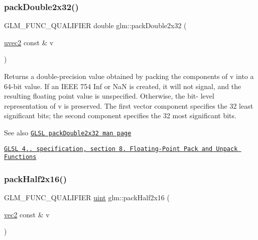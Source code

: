 \subsubsection{\texorpdfstring{pack\+Double2x32()}{packDouble2x32()}}
{\footnotesize\ttfamily G\+L\+M\+\_\+\+F\+U\+N\+C\+\_\+\+Q\+U\+A\+L\+I\+F\+I\+ER double glm\+::pack\+Double2x32 (\begin{DoxyParamCaption}\item[{\hyperlink{group__core__types_gafd2041b45eff671aa8899d2c2835eee9}{uvec2} const \&}]{v }\end{DoxyParamCaption})}

Returns a double-\/precision value obtained by packing the components of v into a 64-\/bit value. If an I\+E\+EE 754 Inf or NaN is created, it will not signal, and the resulting floating point value is unspecified. Otherwise, the bit-\/ level representation of v is preserved. The first vector component specifies the 32 least significant bits; the second component specifies the 32 most significant bits.

\begin{DoxySeeAlso}{See also}
\href{http://www.opengl.org/sdk/docs/manglsl/xhtml/packDouble2x32.xml}{\tt G\+L\+SL pack\+Double2x32 man page} 

\href{http://www.opengl.org/registry/doc/GLSLangSpec.4.20.8.pdf}{\tt G\+L\+SL 4.. specification, section 8. Floating-\/\+Point Pack and Unpack Functions} 
\end{DoxySeeAlso}
\mbox{\label{group__core__func__packing_ga082f6dd65f73a547ed3067ef00be036f}} 
\subsubsection{\texorpdfstring{pack\+Half2x16()}{packHalf2x16()}}
{\footnotesize\ttfamily G\+L\+M\+\_\+\+F\+U\+N\+C\+\_\+\+Q\+U\+A\+L\+I\+F\+I\+ER \hyperlink{group__core__precision_ga4fd29415871152bfb5abd588334147c8}{uint} glm\+::pack\+Half2x16 (\begin{DoxyParamCaption}\item[{\hyperlink{group__core__types_gaa1618f51db67eaa145db101d8c8431d8}{vec2} const \&}]{v }\end{DoxyParamCaption})}

